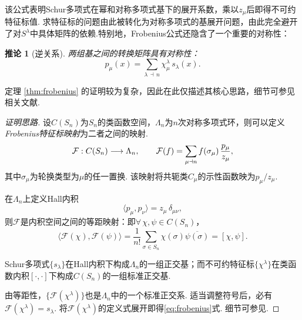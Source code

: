 \documentclass{sjtureport}
\newtheorem{corollary}[theorem]{推论}
\begin{document}
该公式表明Schur多项式在幂和对称多项式基下的展开系数，乘以$z_\mu$后即得不可约特征标值. 求特征标的问题由此被转化为对称多项式的基展开问题，由此完全避开了对$S^\lambda$中具体矩阵的依赖.特别地，Frobenius公式还隐含了一个重要的对称性：
\begin{corollary}[逆关系]\label{cor:inv}
    两组基之间的转换矩阵具有对称性：
    \begin{equation*}
        p_\mu(x) = \sum_{\lambda \,\dashv\, n} \chi^\lambda_\mu \, s_\lambda(x).
    \end{equation*}
\end{corollary}

定理 \ref{thm:frobenius} 的证明较为复杂，因此在此仅描述其核心思路，细节可参见相关文献.
\begin{proof}[证明思路]
    设$C(S_n)$为$S_n$的类函数空间，$\Lambda_n$为$n$次对称多项式环，则可以定义\emph{Frobenius特征标映射}为二者之间的映射.
    \begin{equation*}
        \mathcal{F}: C(S_n) \longrightarrow \Lambda_n,\qquad\index{f@Frobenius 特征标映射 $\mathcal{F}$}
        \mathcal{F}(f) = \sum_{\mu \dashv n} f(\sigma_\mu)\,\frac{p_\mu}{z_\mu},
    \end{equation*}
    其中$\sigma_\mu$为轮换类型为$\mu$的任一置换. 该映射将共轭类$C_\mu$的示性函数映为$p_\mu / z_\mu$. 

    在$\Lambda_n$上定义Hall内积
    \begin{equation*}
        \langle p_\mu, p_\nu \rangle = z_\mu\,\delta_{\mu\nu},
    \end{equation*}
    则$\mathcal{F}$是内积空间之间的等距映射：即$\forall\,\chi,\psi\in C(S_n)$，
    \begin{equation*}
        \langle\mathcal{F}(\chi),\mathcal{F}(\psi)\rangle
        = \frac{1}{n!}\sum_{\sigma \in S_n} \chi(\sigma)\overline{\psi(\sigma)}
        = [\chi,\psi].
    \end{equation*}

    Schur多项式$\{s_\lambda\}$在Hall内积下构成$\Lambda_n$的一组正交基；而不可约特征标$\{\chi^\lambda\}$在类函数内积$[\cdot,\cdot]$下构成$C(S_n)$的一组标准正交基. \par
    由等距性，$\{\mathcal{F}(\chi^\lambda)\}$也是$\Lambda_n$中的一个标准正交系. 适当调整符号后，必有$\mathcal{F}(\chi^\lambda) = s_\lambda$. 将$\mathcal{F}(\chi^\lambda)$的定义式展开即得\eqref{eq:frobenius}式. 细节可参见\cite{FultonHarris}.
\end{proof}
\end{document}
